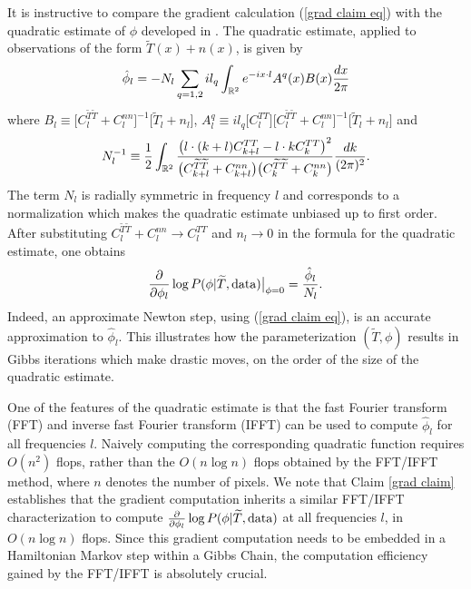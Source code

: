 \documentclass[iop,revtex4,apj,onecolumn]{emulateapj}
\begin{document}
It is instructive to compare the gradient calculation (\ref{grad claim eq}) with the quadratic estimate of $\phi$ 
 developed in \cite{hu2001mapping,hu2002mass}. The quadratic estimate, applied to observations of the form $ \widetilde T(x) + n(x)$, is given by 
 \begin{equation}
\label{quad estimate}
 \hat \phi_l = - N_l  \sum_{q=1,2} i  l_q \int_{\Bbb R^2} e^{-i x\cdot l} A^q(x)B(x) \frac{dx}{2\pi}  
\end{equation}
where  $B_l  \equiv \bigl[C_l^{\widetilde T\widetilde T}+ C_l^{nn}\bigr]^{-1}\bigl[\widetilde T_l + n_l \bigr]$, $A^q_l\equiv il_q\bigl[ C_l^{TT}\bigr]\bigl[C_l^{\widetilde T\widetilde T} + C_l^{nn}\bigr]^{-1} \bigl[\widetilde T_l + n_l \bigr]$ and 
\[
N_l^{-1} \equiv \frac{1}{2} \int_{\Bbb R^2}  \frac{\bigl(l\cdot(k+l) C^{TT}_{k+l} - l\cdot k C^{TT}_{k} \bigr)^2}{\bigl(C^{\widetilde T\widetilde T}_{k+l}+ C_{k+l}^{nn} \bigr)\bigl(  C^{\widetilde T\widetilde T}_{k}+ C_{k}^{nn} \bigr)}\frac{dk}{(2\pi)^2}.
\] 
The term $N_l$ is radially symmetric in frequency $l$ and corresponds to a normalization which makes the quadratic estimate unbiased up to first order. After substituting $ C_l^{\widetilde T\widetilde T} + C_l^{nn}\rightarrow C_l^{TT}$ and $n_l \rightarrow 0$ in the formula for the quadratic estimate, one obtains 
\[
 \frac{\partial}{\partial \phi_l}\log P(\phi | \widetilde T,  \text{\rm data})\bigr|_{\phi = 0} = \frac{\hat \phi_l}{N_l}.
\]
Indeed, an approximate Newton step, using (\ref{grad claim eq}), is an accurate approximation to $\hat \phi_l$.  This illustrates how the parameterization $(\widetilde T, \phi)$ results in Gibbs iterations which make drastic moves, on the order of the size of the quadratic estimate. 

One of the features of the quadratic estimate is that the fast Fourier transform (FFT) and inverse fast Fourier transform (IFFT) can be used to compute $\hat \phi_l$ for all frequencies $l$. Naively computing the corresponding quadratic function requires $O(n^2)$ flops, rather than the $O(n\log n)$ flops obtained by the FFT/IFFT method, where $n$ denotes the number of pixels. We note that Claim \ref{grad claim} establishes that the gradient computation inherits a similar FFT/IFFT characterization to compute $ \frac{\partial}{\partial \phi_l}\log P(\phi | \widetilde T,  \text{\rm data})$ at all frequencies $l$, in $O(n\log n)$ flops. Since this gradient computation needs to be embedded in a  Hamiltonian Markov step within a Gibbs Chain, the computation efficiency gained by the FFT/IFFT is absolutely crucial.  
\end{document}
